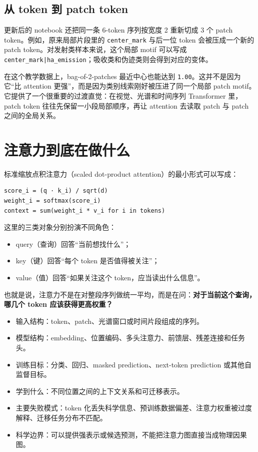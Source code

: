 \subsection*{从 token 到 patch token}

更新后的 notebook 还把同一条 6-token 序列按宽度 2 重新切成 3 个 patch token。例如，原来局部片段里的 \texttt{center\_mark} 与后一位 token 会被压成一个新的 patch token。对发射类样本来说，这个局部 motif 可以写成 \texttt{center\_mark|ha\_emission}；吸收类和伪迹类则会得到对应的变体。

在这个教学数据上，bag-of-2-patches 最近中心也能达到 \texttt{1.00}。这并不是因为它“比 attention 更强”，而是因为类别线索刚好被压进了同一个局部 patch motif。它提供了一个很重要的过渡直觉：在视觉、光谱和时间序列 Transformer 里，patch token 往往先保留一小段局部顺序，再让 attention 去读取 patch 与 patch 之间的全局关系。

\section{注意力到底在做什么}

标准缩放点积注意力（scaled dot-product attention）的最小形式可以写成：

\begin{examplebox}[一个最小注意力公式]
\begin{lstlisting}[style=pythonstyle]
score_i = (q · k_i) / sqrt(d)
weight_i = softmax(score_i)
context = sum(weight_i * v_i for i in tokens)
\end{lstlisting}
\end{examplebox}

这里的三类对象分别扮演不同角色：

\begin{itemize}
    \item query（查询）回答“当前想找什么”；
    \item key（键）回答“每个 token 是否值得被关注”；
    \item value（值）回答“如果关注这个 token，应当读出什么信息”。
\end{itemize}

也就是说，注意力不是在对整段序列做统一平均，而是在问：\textbf{对于当前这个查询，哪几个 token 应该获得更高权重？}

\begin{examplebox}
\begin{itemize}
    \item 输入结构：token、patch、光谱窗口或时间片段组成的序列。
    \item 模型结构：embedding、位置编码、多头注意力、前馈层、残差连接和任务头。
    \item 训练目标：分类、回归、masked prediction、next-token prediction 或其他自监督目标。
    \item 学到什么：不同位置之间的上下文关系和可迁移表示。
    \item 主要失败模式：token 化丢失科学信息、预训练数据偏差、注意力权重被过度解释、迁移任务分布不匹配。
    \item 科学边界：可以提供强表示或候选预测，不能把注意力图直接当成物理因果图。
\end{itemize}
\end{examplebox}

